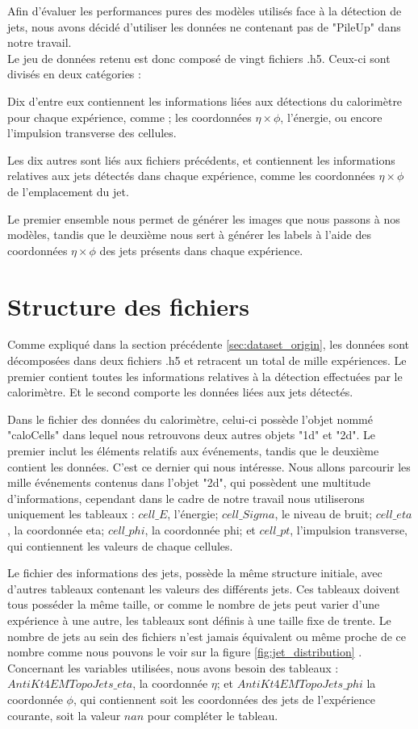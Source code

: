 Afin d'évaluer les performances pures des modèles utilisés face à la détection de jets, nous avons décidé d'utiliser les données ne contenant pas de "PileUp" dans notre travail.\\

Le jeu de données retenu est donc composé de vingt fichiers .h5. Ceux-ci sont divisés en deux catégories :

Dix d'entre eux contiennent les informations liées aux détections du calorimètre pour chaque expérience, comme ; les coordonnées $\eta \times \phi$, l'énergie, ou encore l'impulsion transverse des cellules.

Les dix autres sont liés aux fichiers précédents, et contiennent les informations relatives aux jets détectés dans chaque expérience, comme les coordonnées $\eta \times \phi$ de l'emplacement du jet.

Le premier ensemble nous permet de générer les images que nous passons à nos modèles, tandis que le deuxième nous sert à générer les labels à l'aide des coordonnées $\eta \times \phi$ des jets présents dans chaque expérience.

\section{Structure des fichiers}
\label{sec:files_structure}

Comme expliqué dans la section précédente \ref{sec:dataset_origin}, les données sont décomposées dans deux fichiers .h5 et retracent un total de mille expériences. Le premier contient toutes les informations relatives à la détection effectuées par le calorimètre. Et le second comporte les données liées aux jets détectés.

Dans le fichier des données du calorimètre, celui-ci possède l'objet nommé "caloCells" dans lequel nous retrouvons deux autres objets "1d" et "2d". Le premier inclut les éléments relatifs aux événements, tandis que le deuxième contient les données. C'est ce dernier qui nous intéresse. Nous allons parcourir les mille événements contenus dans l'objet "2d", qui possèdent une multitude d'informations, cependant dans le cadre de notre travail nous utiliserons uniquement les tableaux : $cell\_E$, l'énergie; $cell\_Sigma$, le niveau de bruit; $cell\_eta$, la coordonnée eta; $cell\_phi$, la coordonnée phi; et $cell\_pt$, l'impulsion transverse, qui contiennent les valeurs de chaque cellules.

Le fichier des informations des jets, possède la même structure initiale, avec d'autres tableaux contenant les valeurs des différents jets. Ces tableaux doivent tous posséder la même taille, or comme le nombre de jets peut varier d'une expérience à une autre, les tableaux sont définis à une taille fixe de trente. Le nombre de jets au sein des fichiers n'est jamais équivalent ou même proche de ce nombre comme nous pouvons le voir sur la figure \ref{fig:jet_distribution} . Concernant les variables utilisées, nous avons besoin des tableaux : $AntiKt4EMTopoJets\_eta$, la coordonnée $\eta$; et $AntiKt4EMTopoJets\_phi$ la coordonnée $\phi$, qui contiennent soit les coordonnées des jets de l'expérience courante, soit la valeur $nan$ pour compléter le tableau.

